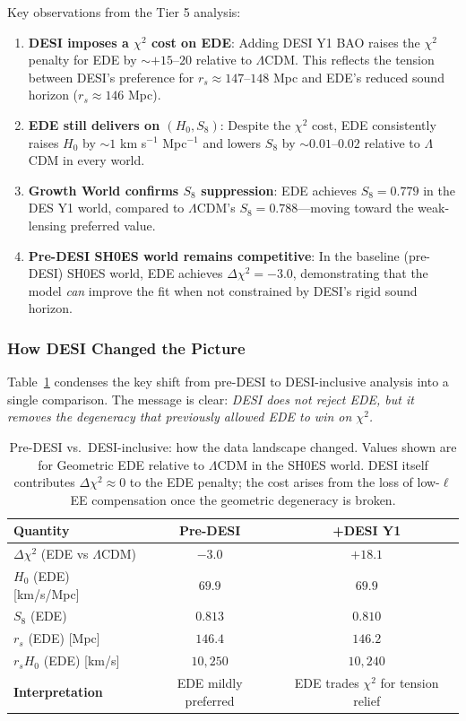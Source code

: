 \documentclass[a4paper,11pt]{article}
\begin{document}
Key observations from the Tier 5 analysis:
\begin{enumerate}
    \item \textbf{DESI imposes a $\chi^2$ cost on EDE}: Adding DESI Y1 BAO raises the $\chi^2$ penalty for EDE by $\sim +15$--$20$ relative to $\Lambda$CDM. This reflects the tension between DESI's preference for $r_s \approx 147$--$148$ Mpc and EDE's reduced sound horizon ($r_s \approx 146$ Mpc).
    \item \textbf{EDE still delivers on $(H_0, S_8)$}: Despite the $\chi^2$ cost, EDE consistently raises $H_0$ by $\sim 1$ km s$^{-1}$ Mpc$^{-1}$ and lowers $S_8$ by $\sim 0.01$--$0.02$ relative to $\Lambda$CDM in every world.
    \item \textbf{Growth World confirms $S_8$ suppression}: EDE achieves $S_8 = 0.779$ in the DES Y1 world, compared to $\Lambda$CDM's $S_8 = 0.788$---moving toward the weak-lensing preferred value.
    \item \textbf{Pre-DESI SH0ES world remains competitive}: In the baseline (pre-DESI) SH0ES world, EDE achieves $\Delta\chi^2 = -3.0$, demonstrating that the model \emph{can} improve the fit when not constrained by DESI's rigid sound horizon.
\end{enumerate}

\subsubsection{How DESI Changed the Picture}
\label{sec:desi_impact}

Table~\ref{tab:desi_impact} condenses the key shift from pre-DESI to DESI-inclusive analysis into a single comparison. The message is clear: \emph{DESI does not reject EDE, but it removes the degeneracy that previously allowed EDE to win on $\chi^2$.}

\begin{table}[h]
\centering
\caption{Pre-DESI vs.\ DESI-inclusive: how the data landscape changed. Values shown are for Geometric EDE relative to $\Lambda$CDM in the SH0ES world. DESI itself contributes $\Delta\chi^2 \approx 0$ to the EDE penalty; the cost arises from the loss of low-$\ell$ EE compensation once the geometric degeneracy is broken.}
\label{tab:desi_impact}
\begin{tabular}{lcc}
\toprule
\textbf{Quantity} & \textbf{Pre-DESI} & \textbf{+DESI Y1} \\
\midrule
$\Delta\chi^2$ (EDE vs $\Lambda$CDM) & $-3.0$ & $+18.1$ \\
$H_0$ (EDE) [km/s/Mpc] & $69.9$ & $69.9$ \\
$S_8$ (EDE) & $0.813$ & $0.810$ \\
$r_s$ (EDE) [Mpc] & $146.4$ & $146.2$ \\
$r_s H_0$ (EDE) [km/s] & $10{,}250$ & $10{,}240$ \\
\midrule
\textbf{Interpretation} & EDE mildly preferred & EDE trades $\chi^2$ for tension relief \\
\bottomrule
\end{tabular}
\end{table}
\end{document}
